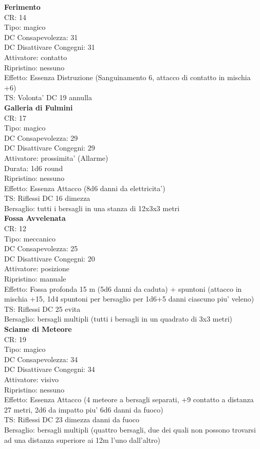 \documentclass[a4paper,11pt,twoside,openany]{dndbook}
\begin{document}
{\begin{multicols}{2}
\textbf{Ferimento}\\
CR: 14 \\
Tipo: magico \\
DC Consapevolezza: 31 \\
DC Disattivare Congegni: 31 \\
Attivatore: contatto \\
Ripristino: nessuno \\
Effetto: Essenza Distruzione (Sanguinamento 6, attacco di contatto in mischia +6)\\
TS: Volonta' DC 19 annulla\\

\textbf{Galleria di Fulmini}\\
CR: 17 \\
Tipo: magico \\
DC Consapevolezza: 29 \\
DC Disattivare Congegni: 29 \\
Attivatore: prossimita' (Allarme) \\
Durata: 1d6 round \\
Ripristino: nessuno \\
Effetto: Essenza Attacco (8d6 danni da elettricita') \\
TS: Riflessi DC 16 dimezza \\
Bersaglio: tutti i bersagli in una stanza di 12x3x3 metri\\

\textbf{Fossa Avvelenata}\\
CR: 12 \\
Tipo: meccanico \\
DC Consapevolezza: 25 \\
DC Disattivare Congegni: 20 \\
Attivatore: posizione \\
Ripristino: manuale \\
Effetto: Fossa profonda 15 m (5d6 danni da caduta) + spuntoni (attacco in mischia +15, 1d4 spuntoni per bersaglio per 1d6+5 danni ciascuno piu' veleno)\\
TS: Riflessi DC 25 evita \\
Bersaglio: bersagli multipli (tutti i bersagli in un quadrato di 3x3 metri)\\

\textbf{Sciame di Meteore}\\
CR: 19 \\
Tipo: magico \\
DC Consapevolezza: 34 \\
DC Disattivare Congegni: 34 \\
Attivatore: visivo\\
Ripristino: nessuno \\
Effetto: Essenza Attacco (4 meteore a bersagli separati, +9 contatto a distanza 27 metri, 2d6 da impatto piu' 6d6 danni da fuoco)\\
TS: Riflessi DC 23 dimezza danni da fuoco\\
Bersaglio: bersagli multipli (quattro bersagli, due dei quali non possono trovarsi ad una distanza superiore ai 12m l’uno dall’altro)\\


\end{multicols}}
\end{document}
